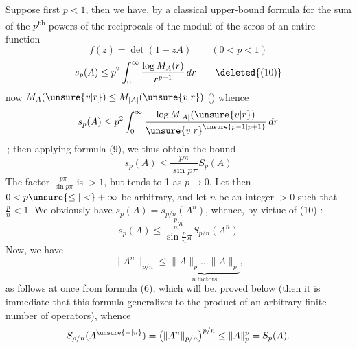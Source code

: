 Suppose first $p<1$, then we have, by
a classical upper-bound formula for the
sum of the $p$\textsuperscript{th} powers of the reciprocals of the
moduli of the zeros of an entire function
\[
f(z)=\det(1-zA)\qquad(0<p<1)
\]
\[
s_p(A)\leq p^2\int_0^\infty\frac{\log M_A(r)}{r^{p+1}}\,dr\tag*{\deleted{(10)}}
\]
now $M_A(\unsure{v|r})\leq M_{|A|}(\unsure{v|r})$ (\unsure{\ldots\ --\ --}) whence
\[
s_p(A)\leq p^2\int_0^\infty\frac{\log M_{|A|}(\unsure{v|r})}{{\unsure{v|r}}^{\unsure{p-1|p+1}}}\,dr
\]
\,; then applying formula
(9), we thus obtain the bound
\[
s_p(A)\leq\frac{p\pi}{\sin p\pi}S_p(A)\tag*{(10)}
\]
The factor $\frac{p\pi}{\sin p\pi}$ is $>1$, but tends to 1
as $p\to0$. Let then $0<p\unsure{\leq|<}+\infty$ be arbitrary,
and let $n$ be an integer $>0$ such that $\frac{p}{n}<1$.
We obviously have $s_p(A)=s_{p/n}(A^n)$, whence, by
virtue of (10) :
\[
s_p(A)\leq\frac{\frac{p}{n}\pi}{\sin\frac{p}{n}\pi}S_{p/n}(A^n)
\]
Now, we have 
\[
\|A^n\|_{p/n}\leq\underbrace{\|A\|_p\ldots\|A\|_p}_{n\ \text{factors}},
\]
as follows at once from formula (6), which will be.
proved below (then it is immediate
that this formula generalizes to the product of an
arbitrary finite number of operators), whence
\[
S_{p/n}(A^{\unsure{{-}|n}})=\left(\|A^n\|_{p/n}\right)^{p/n}
\leq\|A\|_p^p=S_p(A).
\]
